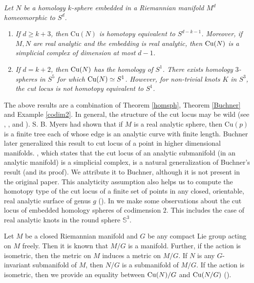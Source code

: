 \begin{mainthm}\label{thm:ThmD}
    \textit{Let $N$ be a homology $k$-sphere embedded in a Riemannian manifold $M^d$ homeomorphic to $S^d$.}
    \begin{enumerate}
        \item \textit{If $d\ge k+3$, then $\mathrm{Cu}(N)$ is homotopy equivalent to $S^{d-k-1}$. Moreover, if $M,N$ are real analytic and the embedding is real analytic, then $\cutn$ is a simplicial complex of dimension at most $d-1$.}
        \item \textit{If $d=k+2$, then $\cutn$ has the homology of $S^1$. There exists homology $3$-spheres in $S^5$ for which $\cutn\simeq S^1$. However, for non-trivial knots $K$ in $S^3$, the cut locus is not homotopy equivalent to $S^1$. }
    \end{enumerate}
\end{mainthm}

\vspace{0.3cm}
\noindent The above results are a combination of Theorem \ref{homsph}, Theorem \ref{Buchner} and Example \ref{codim2}. In general, the structure of the cut locus may be wild (see \cite{GlSi78}, \cite{ItSa16}, and \cite{ItVi15}). S. B. Myers \cite{Mye35} had shown that if $M$ is a real analytic sphere, then $\mathrm{Cu}(p)$ is a finite tree each of whose edge is an analytic curve with finite length. Buchner \cite{Buc77} later generalized this result to cut locus of a point in higher dimensional manifolds. , which states that the cut locus of an analytic submanifold (in an analytic manifold) is a simplicial complex, is a natural generalization of Buchner's result (and its proof). We attribute it to Buchner, although it is not present in the original paper. This analyticity assumption also helps us to compute the homotopy type of the cut locus of a finite set of points in any closed, orientable, real analytic surface of genus $g$ (). In  we make some observations about the cut locus of embedded homology spheres of codimension $2$. This includes the case of real analytic knots in the round sphere $\mathbb{S}^3$.

\vspace{0.3cm}
\hf Let $M$ be a closed Riemannian manifold and $G$ be any compact Lie group acting on $M$ freely. Then it is known that $M/G$ is a manifold. Further, if the action is isometric, then the metric on $M$ induces a metric on $M/G$. If $N$ is any $G$-invariant submanifold of $M$, then $N/G$ is a submanifold of $M/G$. If the action is isometric, then we provide an equality between $\cutn/G$ and $\cutn[N/G]$ ().

